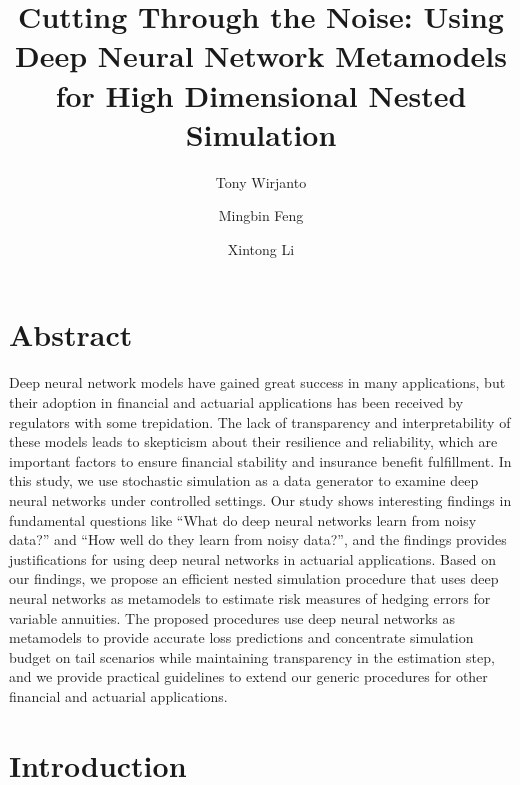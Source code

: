 \documentclass[]{article}
\title{Cutting Through the Noise: Using Deep Neural Network Metamodels for High Dimensional Nested Simulation}
\author{Tony Wirjanto \and Mingbin Feng \and Xintong Li}
\date{}
\begin{document}
\maketitle

\section*{Abstract}

Deep neural network models have gained great success in many applications, but their adoption in financial and actuarial applications has been received by regulators with some trepidation.
The lack of transparency and interpretability of these models leads to skepticism about their resilience and reliability, which are important factors to ensure financial stability and insurance benefit fulfillment.
In this study, we use stochastic simulation as a data generator to examine deep neural networks under controlled settings.
Our study shows interesting findings in fundamental questions like ``What do deep neural networks learn from noisy data?'' and ``How well do they learn from noisy data?'', and the findings provides justifications for using deep neural networks in actuarial applications.
Based on our findings, we propose an efficient nested simulation procedure that uses deep neural networks as metamodels to estimate risk measures of hedging errors for variable annuities.
The proposed procedures use deep neural networks as metamodels to provide accurate loss predictions and concentrate simulation budget on tail scenarios while maintaining transparency in the estimation step, and we provide practical guidelines to extend our generic procedures for other financial and actuarial applications.

\section{Introduction}
\end{document}
